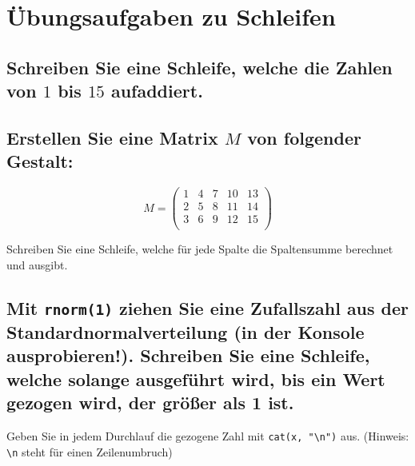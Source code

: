 \documentclass[12pt,a4paper]{article}
\begin{document}
\section{Übungsaufgaben zu
Schleifen}\label{uxfcbungsaufgaben-zu-schleifen}

\subsection{\texorpdfstring{Schreiben Sie eine Schleife, welche die
Zahlen von \(1\) bis \(15\)
aufaddiert.}{Schreiben Sie eine Schleife, welche die Zahlen von 1 bis 15 aufaddiert.}}\label{schreiben-sie-eine-schleife-welche-die-zahlen-von-1-bis-15-aufaddiert.}

\subsection{\texorpdfstring{Erstellen Sie eine Matrix \(M\) von
folgender
Gestalt:}{Erstellen Sie eine Matrix M von folgender Gestalt:}}\label{erstellen-sie-eine-matrix-m-von-folgender-gestalt}

\[
M=\begin{pmatrix}
1 & 4 & 7 & 10 & 13\\
2 & 5 & 8 & 11 & 14\\
3 & 6 & 9 & 12 & 15\\
\end{pmatrix}
\]

Schreiben Sie eine Schleife, welche für jede Spalte die Spaltensumme
berechnet und ausgibt.

\subsection{\texorpdfstring{Mit \texttt{rnorm(1)} ziehen Sie eine
Zufallszahl aus der Standardnormalverteilung (in der Konsole
ausprobieren!). Schreiben Sie eine Schleife, welche solange ausgeführt
wird, bis ein Wert gezogen wird, der größer als 1
ist.}{Mit  ziehen Sie eine Zufallszahl aus der Standardnormalverteilung (in der Konsole ausprobieren!). Schreiben Sie eine Schleife, welche solange ausgeführt wird, bis ein Wert gezogen wird, der größer als 1 ist.}}\label{mit-ziehen-sie-eine-zufallszahl-aus-der-standardnormalverteilung-in-der-konsole-ausprobieren.-schreiben-sie-eine-schleife-welche-solange-ausgefuxfchrt-wird-bis-ein-wert-gezogen-wird-der-gruxf6uxdfer-als-1-ist.}

Geben Sie in jedem Durchlauf die gezogene Zahl mit
\texttt{cat(x,\ "\textbackslash{}n")} aus. (Hinweis:
\texttt{\textbackslash{}n} steht für einen Zeilenumbruch)
\end{document}
